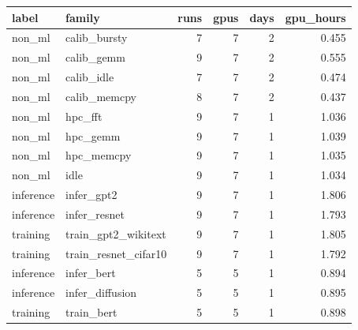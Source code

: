 \begin{tabular}{llrrrr}
\toprule
label & family & runs & gpus & days & gpu\_hours \\
\midrule
non\_ml & calib\_bursty & 7 & 7 & 2 & 0.455 \\
non\_ml & calib\_gemm & 9 & 7 & 2 & 0.555 \\
non\_ml & calib\_idle & 7 & 7 & 2 & 0.474 \\
non\_ml & calib\_memcpy & 8 & 7 & 2 & 0.437 \\
non\_ml & hpc\_fft & 9 & 7 & 1 & 1.036 \\
non\_ml & hpc\_gemm & 9 & 7 & 1 & 1.039 \\
non\_ml & hpc\_memcpy & 9 & 7 & 1 & 1.035 \\
non\_ml & idle & 9 & 7 & 1 & 1.034 \\
inference & infer\_gpt2 & 9 & 7 & 1 & 1.806 \\
inference & infer\_resnet & 9 & 7 & 1 & 1.793 \\
training & train\_gpt2\_wikitext & 9 & 7 & 1 & 1.805 \\
training & train\_resnet\_cifar10 & 9 & 7 & 1 & 1.792 \\
inference & infer\_bert & 5 & 5 & 1 & 0.894 \\
inference & infer\_diffusion & 5 & 5 & 1 & 0.895 \\
training & train\_bert & 5 & 5 & 1 & 0.898 \\
\bottomrule
\end{tabular}
